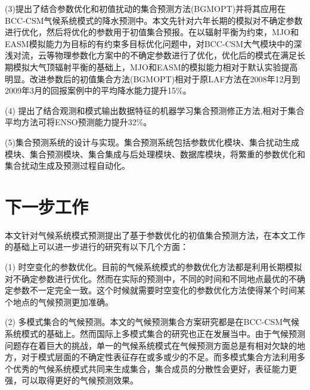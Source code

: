 (3)提出了结合参数优化和初值扰动的集合预测方法(BGMOPT)并将其应用在BCC-CSM气候系统模式的降水预测中。本文先针对六年长期的模拟对不确定参数进行优化，然后将优化的参数用于初值集合预报。在以辐射平衡为约束，MJO和EASM模拟能力为目标的有约束多目标优化问题中，对BCC-CSM大气模块中的深浅对流，云等物理参数化方案中的不确定参数进行了优化，优化后的模式在满足长期模拟大气顶辐射平衡的基础上，MJO和EASM的模拟能力相对于默认实验提高明显。改进参数后的初值集合方法(BGMOPT)相对于原LAF方法在2008年12月到2009年3月的回报案例中的平均降水能力提升15\%。

(4) 提出了结合观测和模式输出数据特征的机器学习集合预测修正方法,相对于集合平均方法可将ENSO预测能力提升32\%。

(5)集合预测系统的设计与实现。集合预测系统包括参数优化模块、集合扰动生成模块、集合预测模块、集合集成与后处理模块、数据库模块，将繁重的参数优化和集合扰动生成及预测过程自动化。


\section{下一步工作}
本文针对气候系统模式预测提出了基于参数优化的初值集合预测方法，在本文工作的基础上可以进一步进行的研究有以下几个方面：

(1) 时空变化的参数优化。目前的气候系统模式的参数优化方法都是利用长期模拟对不确定参数进行优化。然而在实际的预测中，不同的时间和不同地点最优的不确定参数不一定完全一致。这个时候就需要时空变化的参数优化方法使得某个时间某个地点的气候预测更加准确。
 
(2) 多模式集合的气候预测。本文的气候预测集合方案研究都是在BCC-CSM气候系统模式的基础上。然而国际上多模式集合的研究也正在发展当中。由于气候预测问题存在着巨大的挑战，单一的气候系统模式在气候预测方面总是有相对欠缺的地方，对于模式层面的不确定性表征存在或多或少的不足。而多模式集合方法利用多个优秀的气候系统模式共同来生成集合，集合成员的分散性会更好，表征能力更强，可以取得更好的气候预测效果。






